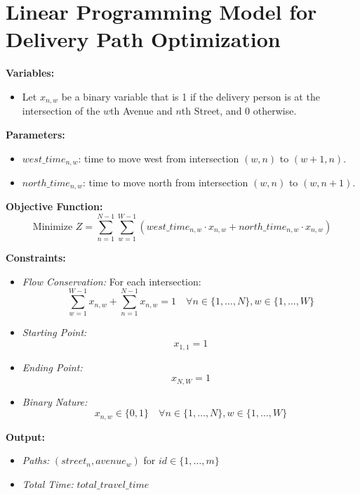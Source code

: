 \documentclass{article}
\begin{document}
\section*{Linear Programming Model for Delivery Path Optimization}

\textbf{Variables:}
\begin{itemize}
    \item Let $x_{n,w}$ be a binary variable that is 1 if the delivery person is at the intersection of the $w$th Avenue and $n$th Street, and 0 otherwise.
\end{itemize}

\textbf{Parameters:}
\begin{itemize}
    \item $west\_time_{n,w}$: time to move west from intersection $(w,n)$ to $(w+1,n)$.
    \item $north\_time_{n,w}$: time to move north from intersection $(w,n)$ to $(w,n+1)$.
\end{itemize}

\textbf{Objective Function:}
\begin{equation}
    \text{Minimize } Z = \sum_{n=1}^{N-1} \sum_{w=1}^{W-1} (west\_time_{n,w} \cdot x_{n,w} + north\_time_{n,w} \cdot x_{n,w})
\end{equation}

\textbf{Constraints:}
\begin{itemize}
    \item \textit{Flow Conservation:}
    For each intersection:
    \begin{equation}
        \sum_{w=1}^{W-1} x_{n,w} + \sum_{n=1}^{N-1} x_{n,w} = 1 \quad \forall n \in \{1, \ldots, N\}, w \in \{1, \ldots, W\}
    \end{equation}
    
    \item \textit{Starting Point:}
    \begin{equation}
        x_{1,1} = 1
    \end{equation}
    
    \item \textit{Ending Point:}
    \begin{equation}
        x_{N,W} = 1
    \end{equation}
    
    \item \textit{Binary Nature:}
    \begin{equation}
        x_{n,w} \in \{0, 1\} \quad \forall n \in \{1, \ldots, N\}, w \in \{1, \ldots, W\}
    \end{equation}
\end{itemize}

\textbf{Output:}
\begin{itemize}
    \item \textit{Paths:} $(street_{n}, avenue_{w})$ for $id \in \{1, \ldots, m\}$
    \item \textit{Total Time:} $total\_travel\_time$
\end{itemize}
\end{document}
